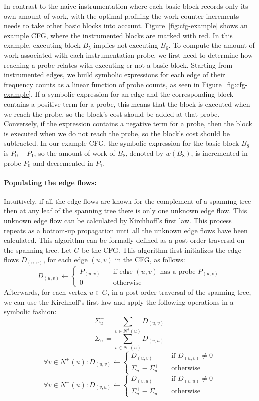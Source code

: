 In contrast to the naive instrumentation where each basic block records only its own amount of work, with the optimal profiling the work
counter increments needs to take other basic blocks into account. Figure~\ref{fig:cfg-example} shows an example CFG, where the instrumented
blocks are marked with red. In this example, executing block $B_5$ implies not executing $B_6$. To compute the amount of work associated
with each instrumentation probe, we first need to determine how reaching a probe relates with executing or not a basic block. Starting from
instrumented edges, we build symbolic expressions for each edge of their frequency counts as a linear function of probe counts, as seen in
Figure~\ref{fig:cfg-example}. If a symbolic expression for an edge and the corresponding block contains a positive term for a probe, this
means that the block is executed when we reach the probe, so the block's cost should be added at that probe. Conversely, if the expression
contains a negative term for a probe, then the block is executed when we do not reach the probe, so the block's cost should be subtracted.
In our example CFG, the symbolic expression for the basic block $B_8$ is $P_0 - P_1$, so the amount of work of $B_8$, denoted by $w(B_8)$,
is incremented in probe $P_0$ and decremented in $P_1$.

\paragraph{Populating the edge flows:}
Intuitively, if all the edge flows are known for the complement of a spanning tree then at any leaf of the spanning tree there is only one
unknown edge flow. This unknown edge flow can be calculated by Kirchhoff's first law\FIXME{\cite{}}. This process repeats as a bottom-up
propagation until all the unknown edge flows have been calculated. This algorithm can be formally defined as a post-order traversal on the
spanning tree. Let $G$ be the CFG. This algorithm first initializes the edge flows $D_{(u,v)}$, for each edge $(u,v)$ in the CFG, as
follows:
\[
D_{(u,v)} \gets
\begin{cases}
    P_{(u,v)} & \quad \text{if edge $(u,v)$ has a probe $P_{(u,v)}$}\\
    0       & \quad \text{otherwise}
\end{cases}
\]
Afterwards, for each vertex $u\in G$, in a post-order traversal of the spanning tree,
we can use the Kirchhoff's first law and apply the following operations
in a symbolic fashion:
\[
\Sigma^+_u = \sum_{v\in N^+(u)} D_{(u,v)}
\]
\[
\Sigma^-_u = \sum_{v\in N^-(u)} D_{(v,u)}
\]
\[
\forall v\in N^+(u):  D_{(u,v)} \gets
\begin{cases}
    D_{(u,v)} & \quad \text{if $D_{(u,v)}\neq 0$}\\
    \Sigma^-_u - \Sigma^+_u       & \quad \text{otherwise}
\end{cases}
\]
\[
\forall v\in N^-(u):  D_{(v,u)} \gets
\begin{cases}
    D_{(v,u)} & \quad \text{if $D_{(v,u)}\neq 0$}\\
    \Sigma^+_u - \Sigma^-_u       & \quad \text{otherwise}
\end{cases}
\]

